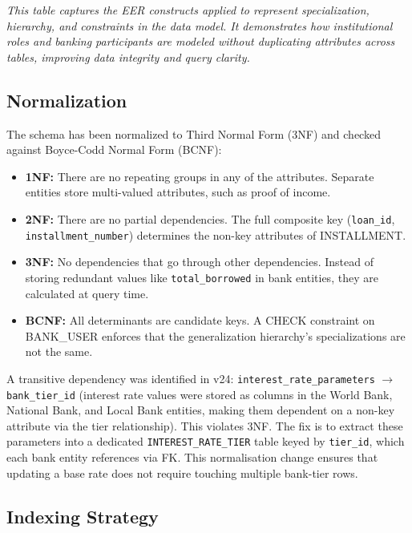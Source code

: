 \documentclass[12pt,a4paper]{report}
\begin{document}
\vspace{2pt}
\noindent\textit{\small This table captures the EER constructs applied to represent specialization, hierarchy, and constraints in the data model. It demonstrates how institutional roles and banking participants are modeled without duplicating attributes across tables, improving data integrity and query clarity.}

\subsection{Normalization}

The schema has been normalized to Third Normal Form (3NF) and checked against Boyce-Codd Normal Form (BCNF):

\begin{itemize}[noitemsep]
\item \textbf{1NF:} There are no repeating groups in any of the attributes. Separate entities store multi-valued attributes, such as proof of income.
\item \textbf{2NF:} There are no partial dependencies. The full composite key (\texttt{loan\_id}, \texttt{installment\_number}) determines the non-key attributes of INSTALLMENT.
\item \textbf{3NF:} No dependencies that go through other dependencies. Instead of storing redundant values like \texttt{total\_borrowed} in bank entities, they are calculated at query time.
\item \textbf{BCNF:} All determinants are candidate keys. A CHECK constraint on BANK\_USER enforces that the generalization hierarchy's specializations are not the same.
\end{itemize}

\label{sec:normalization}
A transitive dependency was identified in v24: \texttt{interest\_rate\_parameters} $\to$ \texttt{bank\_tier\_id} (interest rate values were stored as columns in the World Bank, National Bank, and Local Bank entities, making them dependent on a non-key attribute via the tier relationship). This violates 3NF. The fix is to extract these parameters into a dedicated \texttt{INTEREST\_RATE\_TIER} table keyed by \texttt{tier\_id}, which each bank entity references via FK. This normalisation change ensures that updating a base rate does not require touching multiple bank-tier rows.

\subsection{Indexing Strategy}
\end{document}
